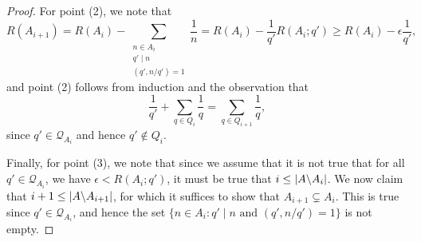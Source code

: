 \begin{proof}
For point (2), we note that
\[R(A_{i+1})= R(A_i)-\sum_{\substack{n\in A_i\\ q'\mid n\\ (q',n/q')=1}}\frac{1}{n} = R(A_i)-\frac{1}{q'}R(A_i;q')\geq R(A_i)-\epsilon \frac{1}{q'},\]
and point (2) follows from induction and the observation that
\[\frac{1}{q'}+\sum_{q\in Q_i}\frac{1}{q}=\sum_{q\in Q_{i+1}}\frac{1}{q},\]
since $q'\in\mathcal{Q}_{A_i}$ and hence $q'\not\in Q_{i}$.

Finally, for point (3), we note that since we assume that it is not true that for all $q'\in\mathcal{Q}_{A_i}$, we have $\epsilon <R(A_i;q')$, it must be true that $i\leq \left\lvert A\backslash A_{i}\right\rvert$. We now claim that $i+1\leq \left\lvert A\backslash A_{i+1}\right\rvert$, for which it suffices to show that $A_{i+1}\subsetneq A_i$. This is true since $q'\in\mathcal{Q}_{A_i}$, and hence the set $\{ n\in A_i : q'\mid n \textrm{ and }(q',n/q')=1\}$ is not empty.
\end{proof}

